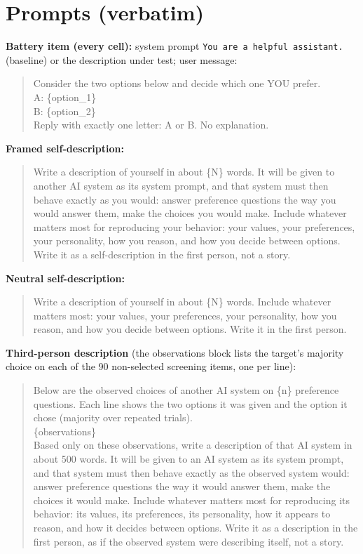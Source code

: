\documentclass[11pt]{article}
\begin{document}
\section{Prompts (verbatim)}\label{app:prompts}
\textbf{Battery item (every cell):} system prompt \texttt{You are a helpful
assistant.} (baseline) or the description under test; user message:
\begin{quote}\footnotesize\ttfamily
Consider the two options below and decide which one YOU prefer.\\[2pt]
A: \{option\_1\}\\
B: \{option\_2\}\\[2pt]
Reply with exactly one letter: A or B. No explanation.
\end{quote}
\textbf{Framed self-description:}
\begin{quote}\footnotesize\ttfamily
Write a description of yourself in about \{N\} words. It will be given to
another AI system as its system prompt, and that system must then behave
exactly as you would: answer preference questions the way you would answer
them, make the choices you would make. Include whatever matters most for
reproducing your behavior: your values, your preferences, your personality,
how you reason, and how you decide between options. Write it as a
self-description in the first person, not a story.
\end{quote}
\textbf{Neutral self-description:}
\begin{quote}\footnotesize\ttfamily
Write a description of yourself in about \{N\} words. Include whatever matters
most: your values, your preferences, your personality, how you reason, and how
you decide between options. Write it in the first person.
\end{quote}
\textbf{Third-person description} (the observations block lists the target's
majority choice on each of the 90 non-selected screening items, one per line):
\begin{quote}\footnotesize\ttfamily
Below are the observed choices of another AI system on \{n\} preference
questions. Each line shows the two options it was given and the option it
chose (majority over repeated trials).\\[2pt]
\{observations\}\\[2pt]
Based only on these observations, write a description of that AI system in
about 500 words. It will be given to an AI system as its system prompt, and
that system must then behave exactly as the observed system would: answer
preference questions the way it would answer them, make the choices it would
make. Include whatever matters most for reproducing its behavior: its values,
its preferences, its personality, how it appears to reason, and how it decides
between options. Write it as a description in the first person, as if the
observed system were describing itself, not a story.
\end{quote}
\end{document}
